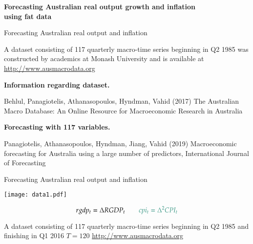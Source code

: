 \documentclass[notes,blackandwhite,mathsans,usenames,dvipsnames]{beamer}
\begin{document}
{
\begin{frame}

\begin{adjustwidth}{-0.5cm}{0cm}
\vspace{8cm}\large
\textbf{{\color{mcxs1}Forecasting Australian real output growth and inflation} \\
{\color{mcxs5}using fat data}}
\end{adjustwidth}

\end{frame}
}




\begin{frame}{Forecasting Australian real output and inflation}

{\color{mcxs2}A dataset consisting of 117 quarterly macro-time series beginning in Q2 1985 was constructed by academics at Monash University and is available at} \href{http://www.ausmacrodata.org}{http://www.ausmacrodata.org}


\bigskip\textbf{Information regarding dataset.}\scriptsize

{\color{mcxs2}Behlul, Panagiotelis, Athanasopoulos, Hyndman, Vahid (2017) The Australian Macro Database: An Online Resource for Macroeconomic Research in Australia}

\bigskip\textbf{Forecasting with 117 variables.}\scriptsize

{\color{mcxs2} Panagiotelis, Athanasopoulos, Hyndman, Jiang, Vahid (2019) Macroeconomic forecasting for Australia using a large number of predictors, International Journal of Forecasting}

\end{frame}



\begin{frame}{Forecasting Australian real output and inflation}

\texttt{[image: data1.pdf]}

$$rgdp_t = \Delta RGDP_t\qquad {\color{mcxs2}cpi_t = \Delta^2 CPI_t}$$

\bigskip\footnotesize{\color{mcxs2}A dataset consisting of 117 quarterly macro-time series beginning in Q2 1985 and finishing in Q1 2016 $T=120$ \href{http://www.ausmacrodata.org}{http://www.ausmacrodata.org}}

\end{frame}
\end{document}
